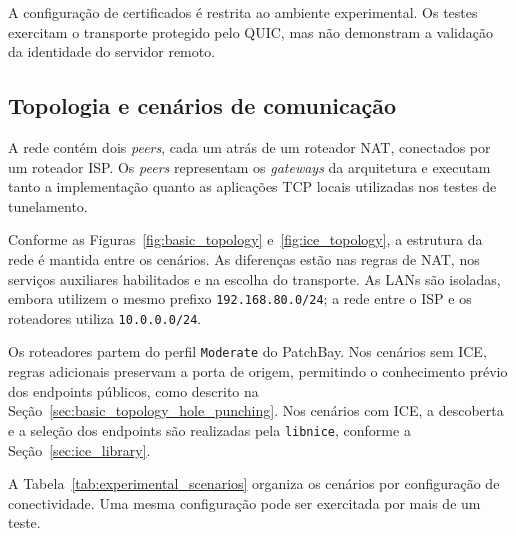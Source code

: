 A configuração de certificados é restrita ao ambiente experimental. Os testes exercitam o transporte protegido pelo QUIC, mas não demonstram a validação da identidade do servidor remoto.

\subsection{Topologia e cenários de comunicação}
\label{sec:experimental_scenarios}

A rede contém dois \textit{peers}, cada um atrás de um roteador NAT, conectados por um roteador ISP. Os \textit{peers} representam os \textit{gateways} da arquitetura e executam tanto a implementação quanto as aplicações TCP locais utilizadas nos testes de tunelamento.

Conforme as Figuras~\ref{fig:basic_topology} e~\ref{fig:ice_topology}, a estrutura da rede é mantida entre os cenários. As diferenças estão nas regras de NAT, nos serviços auxiliares habilitados e na escolha do transporte. As LANs são isoladas, embora utilizem o mesmo prefixo \texttt{192.168.80.0/24}; a rede entre o ISP e os roteadores utiliza \texttt{10.0.0.0/24}.

Os roteadores partem do perfil \texttt{Moderate} do PatchBay. Nos cenários sem ICE, regras adicionais preservam a porta de origem, permitindo o conhecimento prévio dos endpoints públicos, como descrito na Seção~\ref{sec:basic_topology_hole_punching}. Nos cenários com ICE, a descoberta e a seleção dos endpoints são realizadas pela \texttt{libnice}, conforme a Seção~\ref{sec:ice_library}.

A Tabela~\ref{tab:experimental_scenarios} organiza os cenários por configuração de conectividade. Uma mesma configuração pode ser exercitada por mais de um teste.

